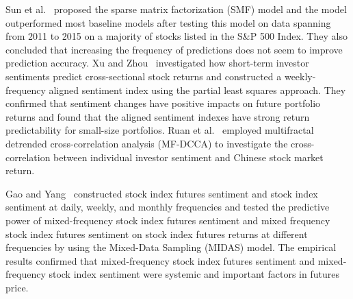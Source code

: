 \documentclass[review,3p,times,12pt,number]{elsarticle}
\begin{document}
Sun et al.~\cite{Sun2016Trade} proposed the sparse matrix factorization (SMF) model and the model outperformed most baseline models after testing this model on data spanning from 2011 to 2015 on a majority of stocks listed in the S\&P 500 Index. They also concluded that increasing the frequency of predictions does not seem to improve prediction accuracy.
Xu and Zhou~\cite{Xu2018A} investigated how short-term investor sentiments predict cross-sectional stock returns and constructed a weekly-frequency aligned sentiment index using the partial least squares approach. They confirmed that sentiment changes have positive impacts on future portfolio returns and found that the aligned sentiment indexes have strong return predictability for small-size portfolios.
Ruan et al.~\cite{Ruan2018Cross} employed multifractal detrended cross-correlation analysis (MF-DCCA) to investigate the cross-correlation between individual investor sentiment and Chinese stock market return.

Gao and Yang~\cite{Gao2017Forecasting} constructed stock index futures sentiment and stock index sentiment at daily, weekly, and monthly frequencies and tested the predictive power of mixed-frequency stock index futures sentiment and mixed frequency stock index futures sentiment on stock index futures returns at different frequencies by using the Mixed-Data Sampling (MIDAS) model. The empirical results confirmed that mixed-frequency stock index futures sentiment and mixed-frequency stock index sentiment were systemic and important factors in futures price.
\end{document}
